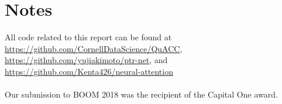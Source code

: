 \documentclass{article}
\begin{document}
\section{Notes}
All code related to this report can be found at \url{https://github.com/CornellDataScience/QuACC}, \\
\url{https://github.com/yujiakimoto/ptr-net}, and \url{https://github.com/Kenta426/neural-attention} \\
\\
Our submission to BOOM 2018 was the recipient of the Capital One award.

\newpage


\end{document}
